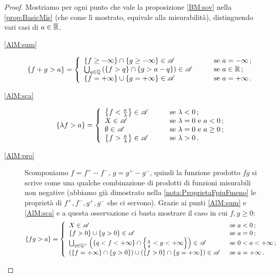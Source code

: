 \begin{proof}
	Mostriamo per ogni punto che vale la proposizione \ref{BM:sov} nella \cref{prop:BasicMis} (che come lì mostrato, equivale alla misurabilità),
	distinguendo vari casi di $a\in \overline{\mathbb R}$.
	\begin{description}
	\item[\ref{AlM:sum}]
	\[
		\{f+g>a\}=\left\{\begin{array}{ll}
			\{f\ge -\infty\}\cap\{g\ge -\infty\}\in \mathscr A &\qquad \text{se $a=-\infty$}\, \text{; }\\
			\bigcup_{q\in \mathbb Q}\left(\{f>q\}\cap\{g>a-q\}\right)\in \mathscr A &\qquad \text{se $a\in \mathbb R$}\, \text{; }\\
			\{f=+\infty\}\cup\{g=+\infty\}\in \mathscr A &\qquad \text{se $a=+\infty$}\, \text{. }
		\end{array}\right.
	\]
	\item[\ref{AlM:sca}]
	\[
		\{\lambda f>a\}=\left\{\begin{array}{ll}
			\left\{f<\frac{a}{\lambda}\right\}\in \mathscr A &\qquad \text{se $\lambda<0$}\, \text{; } \\
			X \in \mathscr A &\qquad \text{se $\lambda=0$ e $a< 0$}\, \text{; }\\
			\emptyset \in \mathscr A &\qquad \text{se $\lambda=0$ e $a\ge 0$}\, \text{; }\\
			\left\{f>\frac{a}{\lambda}\right\}\in \mathscr A &\qquad \text{se $\lambda>0$}\, \text{. }
		\end{array}\right.
	\]
	\item[\ref{AlM:pro}] Scomponiamo $f=f^+ - f^-$, $g=g^+- g^-$, quindi la funzione prodotto $fg$ si scrive come una qualche combinazione di prodotti di funzioni misurabili non negative (abbiamo già dimostrato nella \cref{nota:ProprietaFpiuFmeno} le proprietà di $f^+,f^-,g^+,g^-$ che ci servono). Grazie ai punti \ref{AlM:sum} e \ref{AlM:sca} e a questa osservazione ci basta mostrare il caso in cui $f,g\ge0$:
	\[
		\{fg>a\}=\left\{\begin{array}{ll}
			X\in \mathscr A &\enspace \text{se $a<0$}\, \text{; }\\
			\{f>0\}\cup\{g>0\}\in \mathscr A &\enspace \text{se $a=0$}\, \text{; }\\
			\bigcup_{q\in \mathbb Q^+}\left(\{q<f<+\infty\}\cap\left\{\frac{a}{q}<g<+\infty \right\} \right)\in \mathscr A &\enspace \text{se $0<a<+\infty$}\, \text{; }\\
			(\{f=+\infty\}\cap\{g>0\})\cup (\{f>0\}\cap\{g=+\infty\})\in \mathscr A &\enspace \text{se $a=+\infty$}\, \text{. }
		\end{array}\right.
	\]
	\end{description}
\end{proof}

